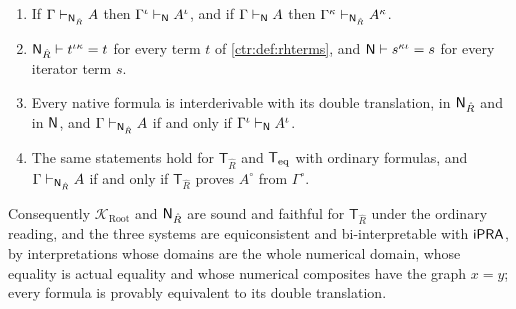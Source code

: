 \begin{theorem}\label{ctr:thm:rootbridge}
\begin{enumerate}
\item If $\Gamma\vdash_{\mathsf{N}_{\hat R}}A$ then $\Gamma^\iota\vdash_{\mathsf{N}}A^\iota$, and if
$\Gamma\vdash_{\mathsf{N}}A$ then $\Gamma^\kappa\vdash_{\mathsf{N}_{\hat R}}A^\kappa$.
\item $\mathsf{N}_{\hat R}\vdash t^{\iota\kappa}=t$ for every term $t$ of \cref{ctr:def:rhterms},
and $\mathsf{N}\vdash s^{\kappa\iota}=s$ for every iterator term $s$.
\item Every native formula is interderivable with its double translation, in $\mathsf{N}_{\hat R}$
and in $\mathsf{N}$, and $\Gamma\vdash_{\mathsf{N}_{\hat R}}A$ if and only if
$\Gamma^\iota\vdash_{\mathsf{N}}A^\iota$.
\item The same statements hold for $\mathsf T_{\hat R}$ and $\mathsf{T}_{\mathrm{eq}}$ with ordinary formulas, and
$\Gamma\vdash_{\mathsf{N}_{\hat R}}A$ if and only if $\mathsf T_{\hat R}$ proves $A^\circ$ from
$\Gamma^\circ$.
\end{enumerate}
Consequently $\mathcal K_{\mathrm{Root}}$ and $\mathsf{N}_{\hat R}$ are sound and faithful for
$\mathsf T_{\hat R}$ under the ordinary reading, and the three systems are equiconsistent and bi-interpretable with $\mathsf{iPRA}$, by
interpretations whose domains are the whole numerical domain, whose equality is actual
equality and whose numerical composites have the graph $x=y$; every formula is provably
equivalent to its double translation.
\end{theorem}
